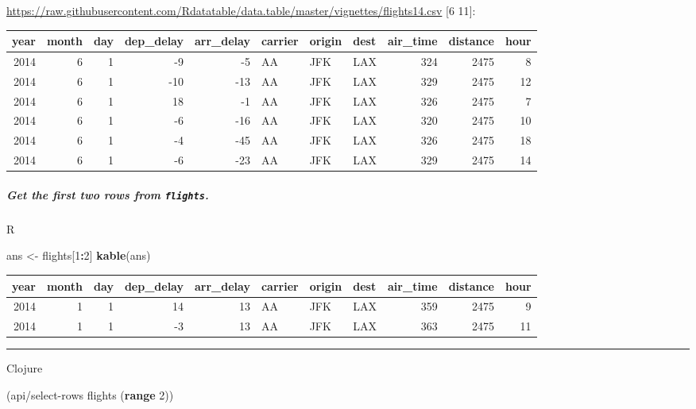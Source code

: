 \documentclass[]{article}
\newenvironment{Shaded}{\begin{snugshade}}{\end{snugshade}}
\newcommand{\KeywordTok}[1]{\textcolor[rgb]{0.13,0.29,0.53}{\textbf{#1}}}
\newcommand{\DecValTok}[1]{\textcolor[rgb]{0.00,0.00,0.81}{#1}}
\newcommand{\StringTok}[1]{\textcolor[rgb]{0.31,0.60,0.02}{#1}}
\newcommand{\OperatorTok}[1]{\textcolor[rgb]{0.81,0.36,0.00}{\textbf{#1}}}
\newcommand{\NormalTok}[1]{#1}
\let\oldsubparagraph\subparagraph
\renewcommand{\subparagraph}[1]{\oldsubparagraph{#1}\mbox{}}
\begin{document}
\url{https://raw.githubusercontent.com/Rdatatable/data.table/master/vignettes/flights14.csv}
{[}6 11{]}:

\begin{longtable}[]{@{}rrrrrlllrrr@{}}
\toprule
year & month & day & dep\_delay & arr\_delay & carrier & origin & dest &
air\_time & distance & hour\tabularnewline
\midrule
\endhead
2014 & 6 & 1 & -9 & -5 & AA & JFK & LAX & 324 & 2475 & 8\tabularnewline
2014 & 6 & 1 & -10 & -13 & AA & JFK & LAX & 329 & 2475 &
12\tabularnewline
2014 & 6 & 1 & 18 & -1 & AA & JFK & LAX & 326 & 2475 & 7\tabularnewline
2014 & 6 & 1 & -6 & -16 & AA & JFK & LAX & 320 & 2475 &
10\tabularnewline
2014 & 6 & 1 & -4 & -45 & AA & JFK & LAX & 326 & 2475 &
18\tabularnewline
2014 & 6 & 1 & -6 & -23 & AA & JFK & LAX & 329 & 2475 &
14\tabularnewline
\bottomrule
\end{longtable}

\subparagraph{\texorpdfstring{Get the first two rows from
\texttt{flights}.}{Get the first two rows from flights.}}\label{get-the-first-two-rows-from-flights.}

R

\begin{Shaded}
\begin{Highlighting}[]
\NormalTok{ans <-}\StringTok{ }\NormalTok{flights[}\DecValTok{1}\OperatorTok{:}\DecValTok{2}\NormalTok{]}
\KeywordTok{kable}\NormalTok{(ans)}
\end{Highlighting}
\end{Shaded}

\begin{longtable}[]{@{}rrrrrlllrrr@{}}
\toprule
year & month & day & dep\_delay & arr\_delay & carrier & origin & dest &
air\_time & distance & hour\tabularnewline
\midrule
\endhead
2014 & 1 & 1 & 14 & 13 & AA & JFK & LAX & 359 & 2475 & 9\tabularnewline
2014 & 1 & 1 & -3 & 13 & AA & JFK & LAX & 363 & 2475 & 11\tabularnewline
\bottomrule
\end{longtable}

\begin{center}\rule{0.5\linewidth}{0.5pt}\end{center}

Clojure

\begin{Shaded}
\begin{Highlighting}[]
\NormalTok{(api/select-rows flights (}\KeywordTok{range} \DecValTok{2}\NormalTok{))}
\end{Highlighting}
\end{Shaded}
\end{document}
